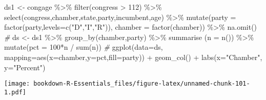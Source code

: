 \documentclass[
]{book}
\newenvironment{Shaded}{\begin{snugshade}}{\end{snugshade}}
\newcommand{\AttributeTok}[1]{\textcolor[rgb]{0.77,0.63,0.00}{#1}}
\newcommand{\CommentTok}[1]{\textcolor[rgb]{0.56,0.35,0.01}{\textit{#1}}}
\newcommand{\DecValTok}[1]{\textcolor[rgb]{0.00,0.00,0.81}{#1}}
\newcommand{\FunctionTok}[1]{\textcolor[rgb]{0.00,0.00,0.00}{#1}}
\newcommand{\NormalTok}[1]{#1}
\newcommand{\OtherTok}[1]{\textcolor[rgb]{0.56,0.35,0.01}{#1}}
\newcommand{\SpecialCharTok}[1]{\textcolor[rgb]{0.00,0.00,0.00}{#1}}
\newcommand{\StringTok}[1]{\textcolor[rgb]{0.31,0.60,0.02}{#1}}
\begin{document}
\begin{Shaded}
\begin{Highlighting}[]
\NormalTok{ds1 }\OtherTok{\textless{}{-}}\NormalTok{ congage }\SpecialCharTok{\%\textgreater{}\%} \FunctionTok{filter}\NormalTok{(congress }\SpecialCharTok{\textgreater{}} \DecValTok{112}\NormalTok{) }\SpecialCharTok{\%\textgreater{}\%} \FunctionTok{select}\NormalTok{(congress,chamber,state,party,incumbent,age) }\SpecialCharTok{\%\textgreater{}\%}
 \FunctionTok{mutate}\NormalTok{(}\AttributeTok{party =} \FunctionTok{factor}\NormalTok{(party,}\AttributeTok{levels=}\FunctionTok{c}\NormalTok{(}\StringTok{"D"}\NormalTok{,}\StringTok{"I"}\NormalTok{,}\StringTok{"R"}\NormalTok{)),}
        \AttributeTok{chamber =} \FunctionTok{factor}\NormalTok{(chamber)) }\SpecialCharTok{\%\textgreater{}\%} 
  \FunctionTok{na.omit}\NormalTok{()}
\CommentTok{\#}
\NormalTok{ds }\OtherTok{\textless{}{-}}\NormalTok{ ds1 }\SpecialCharTok{\%\textgreater{}\%} \FunctionTok{group\_by}\NormalTok{(chamber,party)  }\SpecialCharTok{\%\textgreater{}\%}
   \FunctionTok{summarise}\NormalTok{ (}\AttributeTok{n =} \FunctionTok{n}\NormalTok{()) }\SpecialCharTok{\%\textgreater{}\%}
  \FunctionTok{mutate}\NormalTok{(}\AttributeTok{pct =} \DecValTok{100}\SpecialCharTok{*}\NormalTok{n }\SpecialCharTok{/} \FunctionTok{sum}\NormalTok{(n)) }
\CommentTok{\#}
\FunctionTok{ggplot}\NormalTok{(}\AttributeTok{data=}\NormalTok{ds, }\AttributeTok{mapping=}\FunctionTok{aes}\NormalTok{(}\AttributeTok{x=}\NormalTok{chamber,}\AttributeTok{y=}\NormalTok{pct,}\AttributeTok{fill=}\NormalTok{party)) }\SpecialCharTok{+} 
  \FunctionTok{geom\_col}\NormalTok{() }\SpecialCharTok{+}
  \FunctionTok{labs}\NormalTok{(}\AttributeTok{x=}\StringTok{"Chamber"}\NormalTok{, }\AttributeTok{y=}\StringTok{"Percent"}\NormalTok{)}
\end{Highlighting}
\end{Shaded}

\texttt{[image: bookdown-R-Essentials\_files/figure-latex/unnamed-chunk-101-1.pdf]}
\end{document}
